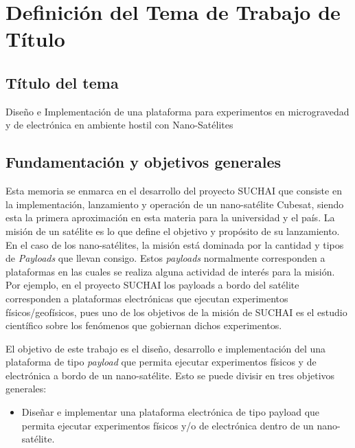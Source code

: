 \documentclass[11pt,letterpaper]{article}
\begin{document}
\newpage
\section{Definición del Tema de Trabajo de Título}

\subsection{Título del tema}

Diseño e Implementación de una plataforma para experimentos en microgravedad y de electrónica en ambiente hostil con Nano-Sat\'elites

\subsection{Fundamentación y objetivos generales}

Esta memoria se enmarca en el desarrollo del proyecto SUCHAI que consiste en la implementación, lanzamiento y operación de un nano-satélite Cubesat, siendo esta la primera aproximación en esta materia para la universidad y el país. La misión de un sat\'elite es lo que define el objetivo y propósito de su lanzamiento. En el caso de los nano-sat\'elites, la misión está dominada por la cantidad y tipos de \textit{Payloads} que llevan consigo. Estos \textit{payloads} normalmente corresponden a plataformas en las cuales se realiza alguna actividad de inter\'es para la misión. Por ejemplo, en el proyecto SUCHAI los payloads a bordo del sat\'elite corresponden a plataformas electrónicas que ejecutan experimentos físicos/geofísicos, pues uno de los objetivos de la misión de SUCHAI es el estudio científico sobre los fenómenos que gobiernan dichos experimentos.

El objetivo de este trabajo es el diseño, desarrollo e implementación del una plataforma de tipo \textit{payload} que permita ejecutar experimentos físicos y de electrónica a bordo de un nano-sat\'elite. Esto se puede divisir en tres objetivos generales:
\begin{itemize}
\item Diseñar e implementar una plataforma electrónica de tipo payload que permita ejecutar experimentos físicos y/o de electrónica dentro de un nano-sat\'elite.
\end{itemize}
\end{document}
